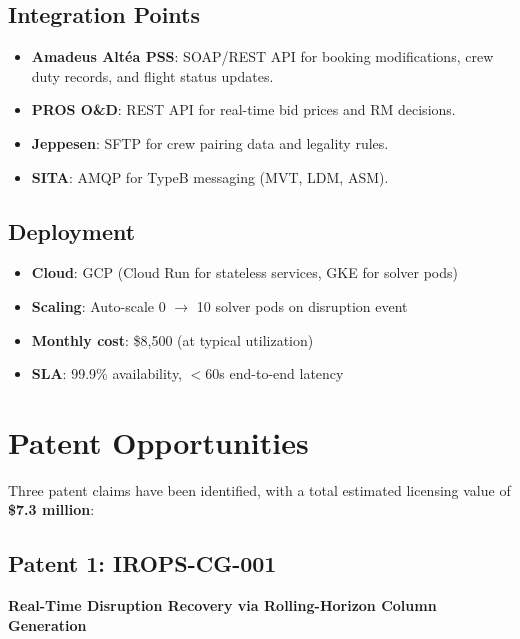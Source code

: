 \documentclass[11pt,a4paper]{book}
\theoremstyle{definition}
\begin{document}
\subsection{Integration Points}

\begin{itemize}
  \item \textbf{Amadeus Alt\'ea PSS}: SOAP/REST API for booking modifications,
    crew duty records, and flight status updates.
  \item \textbf{PROS O\&D}: REST API for real-time bid prices and RM decisions.
  \item \textbf{Jeppesen}: SFTP for crew pairing data and legality rules.
  \item \textbf{SITA}: AMQP for TypeB messaging (MVT, LDM, ASM).
\end{itemize}

\subsection{Deployment}

\begin{itemize}
  \item \textbf{Cloud}: GCP (Cloud Run for stateless services, GKE for solver pods)
  \item \textbf{Scaling}: Auto-scale 0 $\rightarrow$ 10 solver pods on disruption event
  \item \textbf{Monthly cost}: \$8,500 (at typical utilization)
  \item \textbf{SLA}: 99.9\% availability, $<60$s end-to-end latency
\end{itemize}

\section{Patent Opportunities}

Three patent claims have been identified, with a total estimated licensing
value of \textbf{\$7.3 million}:

\subsection{Patent 1: IROPS-CG-001}
\textbf{Real-Time Disruption Recovery via Rolling-Horizon Column Generation}
\end{document}
